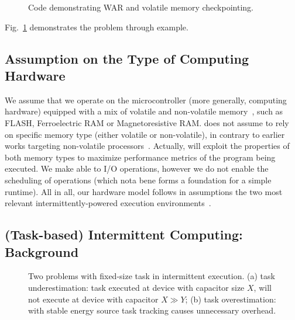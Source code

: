 \begin{figure}
	\centering
	\caption{Code demonstrating WAR and volatile memory checkpointing.}
	\label{fig:code_demo_incosistency}
\end{figure}

Fig.~\ref{fig:code_demo_incosistency} demonstrates the problem through example. 

\subsection{Assumption on the Type of Computing Hardware}
\label{sec:background_hardware}

We assume that we operate on the microcontroller (more generally, computing hardware) equipped with a mix of volatile and non-volatile memory~\cite{}, such as FLASH, Ferroelectric RAM or Magnetoresistive RAM. \sys does not assume to rely on specific memory type (either volatile or non-volatile), in contrary to earlier works targeting non-volatile processors~\cite{ratchet}. Actually, \sys will exploit the properties of both memory types to maximize performance metrics of the program being executed. We make \sys able to I/O operations, however we do not enable the scheduling of operations (which nota bene forms a foundation for a simple runtime). All in all, our hardware model follows in assumptions the two most relevant intermittently-powered execution environments~\cite{alpaca,chain}.

\subsection{(Task-based) Intermittent Computing: Background}

\begin{figure}
	\centering
	\caption{Two problems with fixed-size task in intermittent execution. (a) task underestimation: task executed at device with capacitor size $X$, will not execute at device with capacitor $X\gg Y$; (b) task overestimation: with stable energy source task tracking causes unnecessary overhead.}
	\label{fig:fixed_task_problem}
\end{figure}

